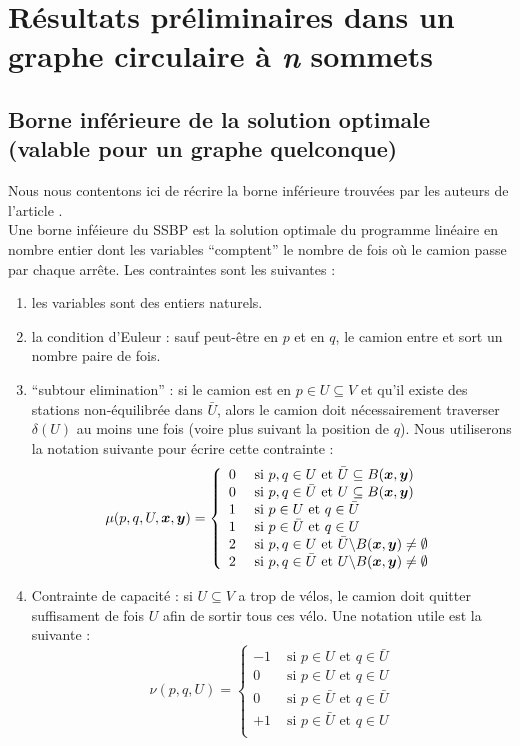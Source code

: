 \documentclass[twoside,11pt,openany,a4paper]{rapport}
\begin{document}
\chapter{Résultats préliminaires dans un graphe circulaire à \emph{n} sommets}

\section{Borne inférieure de la solution optimale (valable pour un graphe quelconque)}
\label{Borne inf générale}

Nous nous contentons ici de récrire la borne inférieure trouvées par les auteurs de l'article \cite{Benchimol2011}.
\\

Une borne inféieure du SSBP est la solution optimale du programme linéaire en nombre entier dont les variables ``comptent'' le nombre de fois où le camion passe par chaque arrête. Les contraintes sont les suivantes :
\begin{enumerate}[label=(\roman*)]
\item les variables sont des entiers naturels.
\item la condition d'Euleur : sauf peut-être en $p$ et en $q$, le camion entre et sort un nombre paire de fois.
\item ``subtour elimination'' : si le camion est en $p \in U \subseteq V $ et qu'il existe des stations non-équilibrée dans $\bar{U}$, alors le camion doit nécessairement traverser $\delta(U)$ au moins une fois (voire plus suivant la position de $q$). Nous utiliserons la notation suivante pour écrire cette contrainte :
\[
\mu(p,q,U,\boldsymbol{x},\boldsymbol{y}) = \left\{
\begin{array}{ll}
  0 &\text{ si } p,q \in U \text{ et } \bar{U} \subseteq B(\boldsymbol{x},\boldsymbol{y})\\
  0 &\text{ si } p,q \in \bar{U} \text{ et } U \subseteq B(\boldsymbol{x},\boldsymbol{y})\\
  1 &\text{ si } p \in U \text{ et } q \in \bar{U}\\
  1 &\text{ si } p \in \bar{U} \text{ et } q \in U\\
  2 &\text{ si } p,q \in U \text{ et } \bar{U} \backslash B(\boldsymbol{x},\boldsymbol{y}) \ne \emptyset\\
  2 &\text{ si } p,q \in \bar{U} \text{ et } U \backslash B(\boldsymbol{x},\boldsymbol{y}) \ne \emptyset
\end{array}
\right.
\]
\item Contrainte de capacité : si $U \subseteq V$ a trop de vélos, le camion doit quitter suffisament de fois $U$ afin de sortir tous ces vélo. Une notation utile est la suivante :
\[
\nu(p,q,U) = \left\{
\begin{array}{ll}
  -1 &\text{ si } p \in U \text{ et } q \in \bar{U}\\
  0  &\text{ si } p \in U \text{ et } q \in U\\
  0  &\text{ si } p \in \bar{U} \text{ et } q \in \bar{U}\\
  +1 &\text{ si } p \in \bar{U} \text{ et } q \in U\\
\end{array}
\right.
\]
\end{enumerate}
\end{document}

